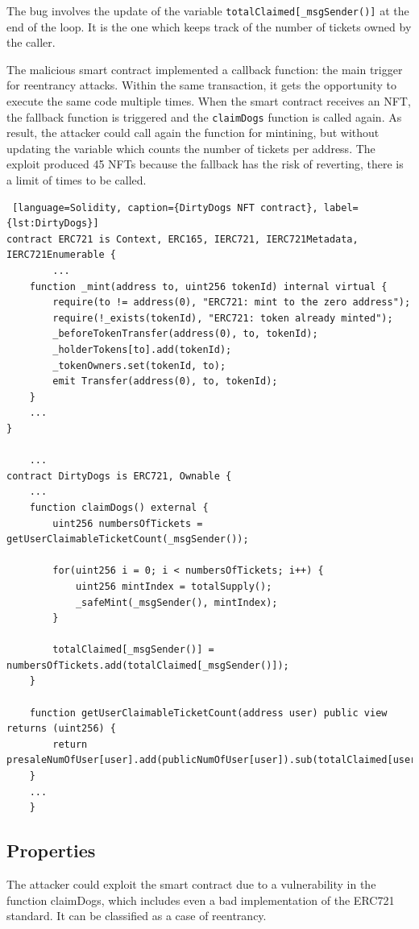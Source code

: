 The bug involves the update of the variable \texttt{totalClaimed[\_msgSender()]} at the end of the loop. It is the one which 
keeps track of the number of tickets owned by the caller.

The malicious smart contract implemented a 
callback function: the main trigger for reentrancy attacks. 
Within the same transaction, it gets the opportunity to execute the same code multiple times. 
When the smart contract receives an NFT, the fallback function is triggered and the \texttt{claimDogs} function is called again. 
As result, the attacker could call again the function for mintining, but without updating the variable which counts the number of tickets per address.
The exploit produced 45 NFTs because the fallback has the risk of reverting, 
there is a limit of times to be called.

    
\begin{lstlisting} [language=Solidity, caption={DirtyDogs NFT contract}, label={lst:DirtyDogs}]
contract ERC721 is Context, ERC165, IERC721, IERC721Metadata, IERC721Enumerable {
        ... 
    function _mint(address to, uint256 tokenId) internal virtual {
        require(to != address(0), "ERC721: mint to the zero address");
        require(!_exists(tokenId), "ERC721: token already minted");
        _beforeTokenTransfer(address(0), to, tokenId);
        _holderTokens[to].add(tokenId);
        _tokenOwners.set(tokenId, to);
        emit Transfer(address(0), to, tokenId);
    }
    ...
}
    
    ... 
contract DirtyDogs is ERC721, Ownable {
    ...
    function claimDogs() external {
        uint256 numbersOfTickets = getUserClaimableTicketCount(_msgSender());
        
        for(uint256 i = 0; i < numbersOfTickets; i++) {
            uint256 mintIndex = totalSupply();
            _safeMint(_msgSender(), mintIndex);
        }

        totalClaimed[_msgSender()] = numbersOfTickets.add(totalClaimed[_msgSender()]);
    }

    function getUserClaimableTicketCount(address user) public view returns (uint256) {
        return presaleNumOfUser[user].add(publicNumOfUser[user]).sub(totalClaimed[user]);
    }
    ...
    }
\end{lstlisting} 

\subsection{Properties}
\label{sec:DirtyDogs:Properties}
The attacker could exploit the smart contract due to a vulnerability in the function claimDogs, 
which includes even a bad implementation of the ERC721 standard. It can be classified as a case of reentrancy. 

